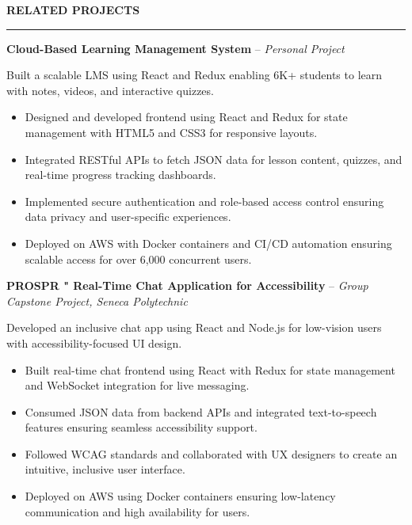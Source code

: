 \documentclass[10pt,letterpaper]{article}
\begin{document}
\vspace{6pt}

\textbf{RELATED PROJECTS}\\[-8pt]
\noindent\rule{\textwidth}{1pt}

\vspace{-2pt}

\textbf{Cloud-Based Learning Management System} -- \emph{Personal Project}

\vspace{-1pt}

Built a scalable LMS using React and Redux enabling 6K+ students to learn with notes, videos, and interactive quizzes.
\vspace{-1pt}
\begin{itemize}
\item Designed and developed frontend using React and Redux for state management with HTML5 and CSS3 for responsive layouts.
\item Integrated RESTful APIs to fetch JSON data for lesson content, quizzes, and real-time progress tracking dashboards.
\item Implemented secure authentication and role-based access control ensuring data privacy and user-specific experiences.
\item Deployed on AWS with Docker containers and CI/CD automation ensuring scalable access for over 6,000 concurrent users.
\end{itemize}

\textbf{PROSPR " Real-Time Chat Application for Accessibility} -- \emph{Group Capstone Project, Seneca Polytechnic}

\vspace{-1pt}

Developed an inclusive chat app using React and Node.js for low-vision users with accessibility-focused UI design.
\vspace{-1pt}
\begin{itemize}
\item Built real-time chat frontend using React with Redux for state management and WebSocket integration for live messaging.
\item Consumed JSON data from backend APIs and integrated text-to-speech features ensuring seamless accessibility support.
\item Followed WCAG standards and collaborated with UX designers to create an intuitive, inclusive user interface.
\item Deployed on AWS using Docker containers ensuring low-latency communication and high availability for users.
\end{itemize}
\end{document}
